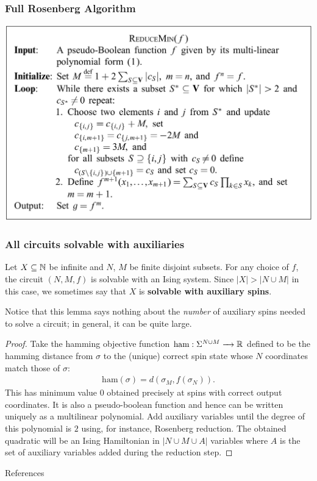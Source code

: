 \documentclass[8pt, mathserif, notheorems]{beamer}
\begin{document}
\begin{frame}[t]\frametitle{Full Rosenberg Algorithm}
  \begin{center}
    \includegraphics[width=1\textwidth]{images/rosenberg-algo.png}
  \end{center}
\end{frame}
\begin{frame}[t]\frametitle{All circuits solvable with auxiliaries}
  \begin{prop}\label{prop:all-circuits-solvable-with-auxiliaries}
  Let $X \subseteq \mathbb{N}$ be infinite and $N$, $M$ be finite disjoint subsets. For any choice of $f$, the circuit $(N, M, f)$ is solvable with an Ising system. Since $|X| > |N\cup M|$ in this case, we sometimes say that $X$ is \textbf{solvable with auxiliary spins}.
\end{prop}
Notice that this lemma says nothing about the \textit{number} of auxiliary spins needed to solve a circuit; in general, it can be quite large.
\begin{proof}
  Take the hamming objective function $\text{ham}:\Sigma^{N\cup M} \to \bR$ defined to be the hamming distance from $\sigma$ to the (unique) correct spin state whose $N$ coordinates match those of $\sigma$:
  \begin{align*}
    \text{ham}(\sigma) = d(\sigma_M, f(\sigma_N)).
  \end{align*}
This has minimum value $0$ obtained precisely at spins with correct output coordinates. It is also a pseudo-boolean function and hence can be written uniquely as a multilinear polynomial. Add auxiliary variables until the degree of this polynomial is $2$ using, for instance, Rosenberg reduction. The obtained quadratic will be an Ising Hamiltonian in $|N \cup M \cup A|$ variables where $A$ is the set of auxiliary variables added during the reduction step. 
\end{proof}
\end{frame}
\begin{frame}[t]{References}

\nocite{*}
\printbibliography
\end{frame}
\end{document}

